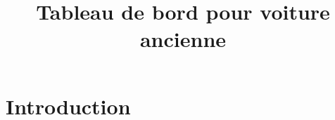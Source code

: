 \documentclass{polytech/polytech}
\title{Tableau de bord pour voiture ancienne}
\begin{document}

\chapter*{Introduction}
\label{chap:intro}

\end{document}
